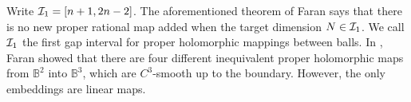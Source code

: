 \documentclass[12pt]{article}
\numberwithin{equation}{section}
\def\BB{{\mathbb B}}
\begin{document}
Write ${\cal I}_1=[n+1,2n-2]$. The aforementioned theorem of Faran
says that there is no new proper rational map added when the target
dimension $N\in {\cal I}_1$. We call ${\cal I}_1$ the first gap
interval for proper holomorphic mappings between balls. In \cite{Fa1},
Faran showed that there are four   different inequivalent proper
holomorphic maps from ${\BB}^2$ into ${\BB}^{3}$,
 which are $C^3$-smooth
up to the boundary. However, the only embeddings  are linear maps.

\end{document}
